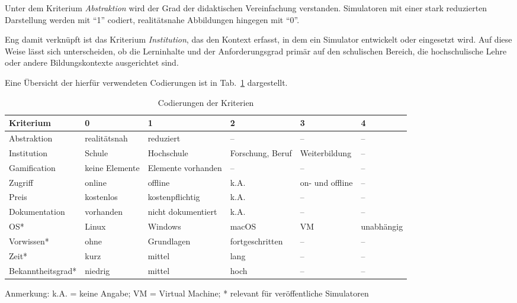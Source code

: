 Unter dem Kriterium \textit{Abstraktion} wird der Grad der didaktischen Vereinfachung verstanden. Simulatoren mit einer stark reduzierten Darstellung werden mit \enquote{1} codiert, realitätsnahe Abbildungen hingegen mit \enquote{0}. 

Eng damit verknüpft ist das Kriterium \textit{Institution}, das den Kontext erfasst, in dem ein Simulator entwickelt oder eingesetzt wird. Auf diese Weise lässt sich unterscheiden, ob die Lerninhalte und der Anforderungsgrad primär auf den schulischen Bereich, die hochschulische Lehre oder andere Bildungskontexte ausgerichtet sind.

Eine Übersicht der hierfür verwendeten Codierungen ist in Tab.~\ref{tab:legende_codierung} dargestellt.

\begin{table}[h]
  \centering
  \caption{Codierungen der Kriterien}
  \label{tab:legende_codierung}
  \tiny
  \begin{tabularx}{\textwidth}{p{2cm}p{1.5cm}p{1.7cm}p{1.7cm}p{1.5cm}p{1.5cm}}
    \toprule
    \textbf{Kriterium} & \textbf{0} & \textbf{1} & \textbf{2} & \textbf{3} & \textbf{4} \\
    \midrule
    Abstraktion       & realitätsnah & reduziert & -- & -- & -- \\
    Institution       & Schule & Hochschule & Forschung, Beruf & Weiterbildung & -- \\
    Gamification      & keine Elemente & Elemente vorhanden & -- & -- & -- \\
    Zugriff           & online & offline & k.A. & on- und offline & -- \\
    Preis             & kostenlos & kostenpflichtig & k.A. & -- & -- \\
    Dokumentation     & vorhanden & nicht dokumentiert & k.A. & -- & -- \\
    OS*               & Linux & Windows & macOS & VM & unabhängig \\
    Vorwissen*        & ohne & Grundlagen & fortgeschritten & -- & -- \\
    Zeit*             & kurz & mittel & lang & -- & -- \\
    Bekanntheitsgrad* & niedrig & mittel & hoch & -- & -- \\
    \bottomrule
  \end{tabularx}
  \vspace{0.5em}
  {\tiny Anmerkung: k.A. = keine Angabe; VM = Virtual Machine; * relevant für veröffentliche Simulatoren}
\end{table}

